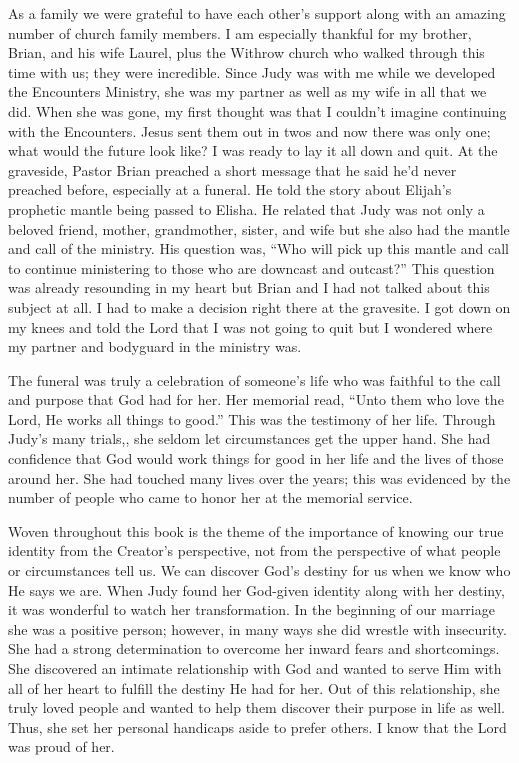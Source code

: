 \documentclass[twoside, 12pt]{book}
\begin{document}
As a family we were grateful to have each other’s support along with an amazing number of church family members. I am especially thankful for my brother, Brian, and his wife Laurel, plus the Withrow church who walked through this time with us; they were incredible. Since Judy was with me while we developed the Encounters Ministry, she was my partner as well as my wife in all that we did. When she was gone, my first thought was that I couldn’t imagine continuing with the Encounters. Jesus sent them out in twos and now there was only one; what would the future look like? I was ready to lay it all down and quit. At the graveside, Pastor Brian preached a short message that he said he’d never preached before, especially at a funeral. He told the story about Elijah’s prophetic mantle being passed to Elisha. He related that Judy was not only a beloved friend, mother, grandmother, sister, and wife but she also had the mantle and call of the ministry. His question was, “Who will pick up this mantle and call to continue ministering to those who are downcast and outcast?” This question was already resounding in my heart but Brian and I had not talked about this subject at all. I had to make a decision right there at the gravesite. I got down on my knees and told the Lord that I was not going to quit but I wondered where my partner and bodyguard in the ministry was.

The funeral was truly a celebration of someone’s life who was faithful to the call and purpose that God had for her. Her memorial read, “Unto them who love the Lord, He works all things to good.” This was the testimony of her life. Through Judy’s many trials,, she seldom let circumstances get the upper hand. She had confidence that God would work things for good in her life and the lives of those around her. She had touched many lives over the years; this was evidenced by the number of people who came to honor her at the memorial service. 

Woven throughout this book is the theme of the importance of knowing our true identity from the Creator’s perspective, not from the perspective of what people or circumstances tell us. We can discover God’s destiny for us when we know who He says we are. When Judy found her God-given identity along with her destiny, it was wonderful to watch her transformation. In the beginning of our marriage she was a positive person; however, in many ways she did wrestle with insecurity. She had a strong determination to overcome her inward fears and shortcomings. She discovered an intimate relationship with God and wanted to serve Him with all of her heart to fulfill the destiny He had for her. Out of this relationship, she truly loved people and wanted to help them discover their purpose in life as well. Thus, she set her personal handicaps aside to prefer others. I know that the Lord was proud of her.
\end{document}

